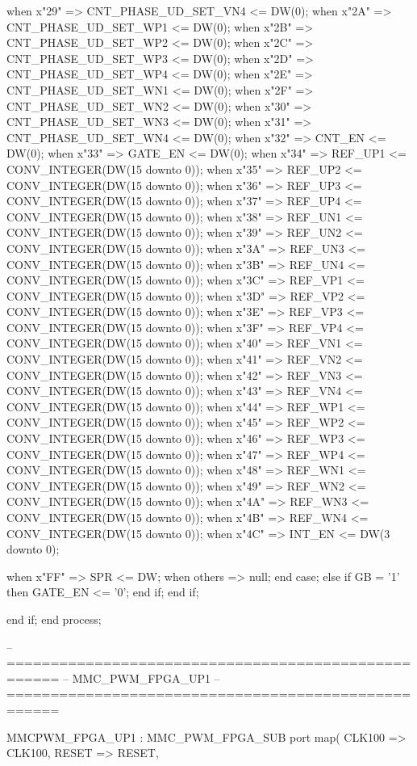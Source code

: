 \begin{mylisting}[language=VHDL,caption=ゲート信号出力モジュール,label=MMC_PWM_GEN_module_VHDL]
					when x"29"	=>	CNT_PHASE_UD_SET_VN4	<= DW(0);
					when x"2A"	=>	CNT_PHASE_UD_SET_WP1	<= DW(0);
					when x"2B"	=>	CNT_PHASE_UD_SET_WP2	<= DW(0);
					when x"2C"	=>	CNT_PHASE_UD_SET_WP3	<= DW(0);
					when x"2D"	=>	CNT_PHASE_UD_SET_WP4	<= DW(0);
					when x"2E"	=>	CNT_PHASE_UD_SET_WN1	<= DW(0);
					when x"2F"	=>	CNT_PHASE_UD_SET_WN2	<= DW(0);
					when x"30"	=>	CNT_PHASE_UD_SET_WN3	<= DW(0);
					when x"31"	=>	CNT_PHASE_UD_SET_WN4	<= DW(0);
					when x"32"	=>	CNT_EN					<= DW(0);
					when x"33"	=>	GATE_EN					<= DW(0);
					when x"34"	=>	REF_UP1				<= CONV_INTEGER(DW(15 downto 0));
					when x"35"	=>	REF_UP2				<= CONV_INTEGER(DW(15 downto 0));
					when x"36"	=>	REF_UP3				<= CONV_INTEGER(DW(15 downto 0));
					when x"37"	=>	REF_UP4				<= CONV_INTEGER(DW(15 downto 0));
					when x"38"	=>	REF_UN1				<= CONV_INTEGER(DW(15 downto 0));
					when x"39"	=>	REF_UN2				<= CONV_INTEGER(DW(15 downto 0));
					when x"3A"	=>	REF_UN3				<= CONV_INTEGER(DW(15 downto 0));
					when x"3B"	=>	REF_UN4				<= CONV_INTEGER(DW(15 downto 0));
					when x"3C"	=>	REF_VP1				<= CONV_INTEGER(DW(15 downto 0));
					when x"3D"	=>	REF_VP2				<= CONV_INTEGER(DW(15 downto 0));
					when x"3E"	=>	REF_VP3				<= CONV_INTEGER(DW(15 downto 0));
					when x"3F"	=>	REF_VP4				<= CONV_INTEGER(DW(15 downto 0));
					when x"40"	=>	REF_VN1				<= CONV_INTEGER(DW(15 downto 0));
					when x"41"	=>	REF_VN2				<= CONV_INTEGER(DW(15 downto 0));
					when x"42"	=>	REF_VN3				<= CONV_INTEGER(DW(15 downto 0));
					when x"43"	=>	REF_VN4				<= CONV_INTEGER(DW(15 downto 0));
					when x"44"	=>	REF_WP1				<= CONV_INTEGER(DW(15 downto 0));
					when x"45"	=>	REF_WP2				<= CONV_INTEGER(DW(15 downto 0));
					when x"46"	=>	REF_WP3				<= CONV_INTEGER(DW(15 downto 0));
					when x"47"	=>	REF_WP4				<= CONV_INTEGER(DW(15 downto 0));
					when x"48"	=>	REF_WN1				<= CONV_INTEGER(DW(15 downto 0));
					when x"49"	=>	REF_WN2				<= CONV_INTEGER(DW(15 downto 0));
					when x"4A"	=>	REF_WN3				<= CONV_INTEGER(DW(15 downto 0));
					when x"4B"	=>	REF_WN4				<= CONV_INTEGER(DW(15 downto 0));
					when x"4C"	=>	INT_EN				<= DW(3 downto 0);
					
				
					when x"FF"	=>	SPR			<= DW;
					when others		=> null;
				end case;
			else
				if GB = '1' then
					GATE_EN	<= '0';
				end if;
			end if;
			
		end if;
	end process;


-- ====================================================
-- MMC_PWM_FPGA_UP1
-- ====================================================

	MMCPWM_FPGA_UP1 : MMC_PWM_FPGA_SUB
		port map(
		CLK100				=> CLK100,
		RESET					=> RESET,
		

\end{mylisting}
